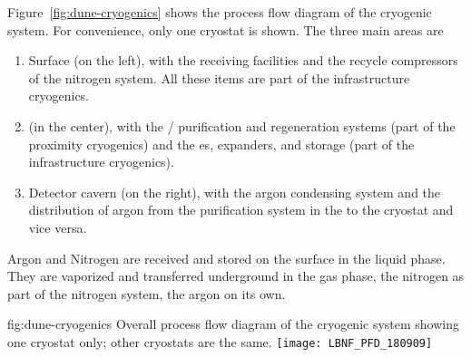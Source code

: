 Figure~\ref{fig:dune-cryogenics} shows the process flow diagram of the
 cryogenic system. For convenience, only one cryostat is shown. The three main areas are 
\begin{enumerate}
  \item Surface (on the left), with the receiving facilities and the
    recycle compressors of the nitrogen system.  All these items are
    part of the infrastructure cryogenics.
  \item
   (in the center), with the /
    purification and regeneration systems (part of the proximity
    cryogenics) and the \coldbox{}es, expanders, and  storage (part of
    the infrastructure cryogenics).
\item Detector cavern (on the right), with the argon condensing system
  and the distribution of argon from the purification system in the
   to the cryostat and vice versa.
\end{enumerate}
Argon and Nitrogen are received and stored on the surface in the
liquid phase.  They are vaporized and transferred underground in the
gas phase, the nitrogen as part of the nitrogen system, the argon on
its own.
\begin{dunefigure}{fig:dune-cryogenics}
  {Overall process flow diagram of the cryogenic system showing one
    cryostat only; other cryostats are the same.}
  \texttt{[image: LBNF\_PFD\_180909]}
\end{dunefigure}


